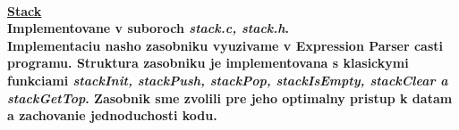 \documentclass[12pt]{article}
\begin{document}
\paragraph{\large \underline{Stack} \\ Implementovane v suboroch \textit{stack.c, stack.h}. \\ \newline
Implementaciu nasho zasobniku vyuzivame  v Expression Parser casti programu. Struktura zasobniku je implementovana s klasickymi funkciami \textit{stackInit, stackPush, stackPop, stackIsEmpty, stackClear a stackGetTop}. Zasobnik sme zvolili pre jeho optimalny pristup k datam a zachovanie jednoduchosti kodu.
\newline \\}
\end{document}
